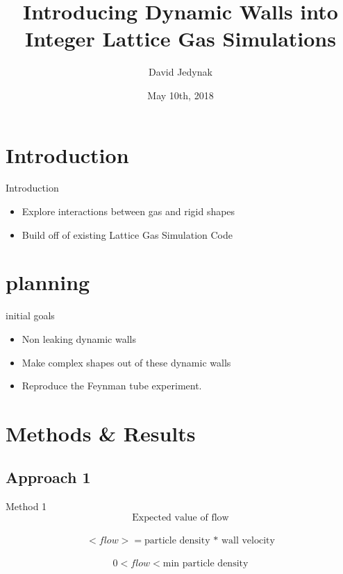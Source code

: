 \documentclass{beamer}
\title[Introducing Dynamic Walls into Integer Lattice Gas Simulations]{Introducing Dynamic Walls into Integer Lattice Gas Simulations}
\author{David Jedynak}
\institute{NDSU}
\date{May 10th, 2018}
\begin{document}
\begin{frame}
  \titlepage
\end{frame}


\section{Introduction}

\begin{frame}{Introduction}

\begin{itemize}
  \item Explore interactions between gas and rigid shapes
  \item Build off of existing Lattice Gas Simulation Code
\end{itemize}

\vskip 1cm

\end{frame}



\section{planning}
\begin{frame}{initial goals}
\begin{itemize}
\item Non leaking dynamic walls
\item Make complex shapes out of these dynamic walls
\item Reproduce the Feynman tube experiment. 
\end{itemize}
\end{frame}

\section{Methods & Results}

\subsection{Approach 1}
\begin{frame}{Method 1}
$$
\textrm{Expected value of flow}$$\\
$$<flow> = \textrm{particle density * wall velocity}$$\\
$$0 < flow < \textrm{min particle density}$$\\
\end{frame}
\end{document}
